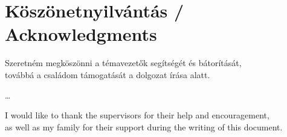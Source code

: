 \documentclass[12pt]{report}
\begin{document}
\vspace*{4cm}

\chapter*{Köszönetnyilvántás / Acknowledgments}

\begin{center}
	Szeretném megköszönni a témavezetők segítségét és bátorítását,\\
	továbbá a családom támogatását a dolgozat írása alatt.
\end{center}
\begin{center}
	\dots
\end{center}
\begin{center}
	I would like to thank the supervisors for their help and encouragement,\\
	as well as my family for their support during the writing of this document.
\end{center}

 

\end{document}
